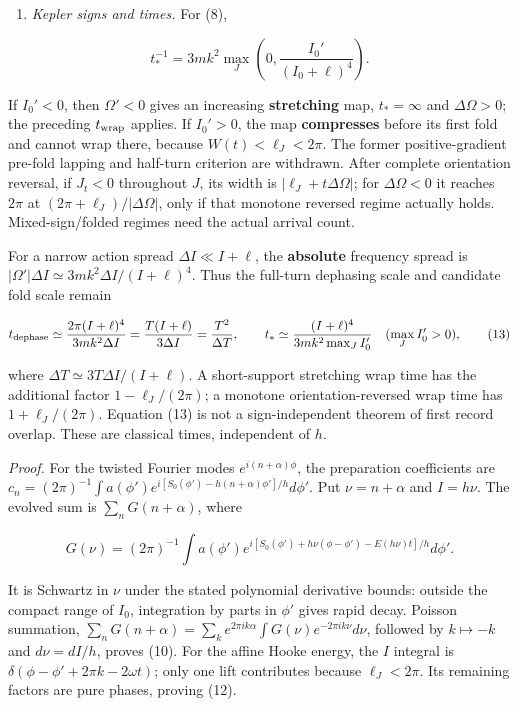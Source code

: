 \documentclass[11pt,a4paper]{article}
\newcommand{\tightlist}{\setlength{\itemsep}{0pt}\setlength{\parskip}{0pt}}
\begin{document}
\begin{enumerate}
\def\labelenumi{(\alph{enumi})}
\setcounter{enumi}{2}
\tightlist
\item
  \emph{Kepler signs and times.} For (8),
\end{enumerate}

\[t_*^{-1}=3mk^2\max_J\left(0,\frac{I_0'}{(I_0+\ell)^4}\right).\]

If \(I_0'<0\), then \(\Omega'<0\) gives an increasing
\textbf{stretching} map, \(t_*=\infty\) and \(\Delta\Omega>0\); the
preceding \(t_{\rm wrap}\) applies. If \(I_0'>0\), the map
\textbf{compresses} before its first fold and cannot wrap there, because
\(W(t)<\ell_J<2\pi\). The former positive-gradient pre-fold lapping and
half-turn criterion are withdrawn. After complete orientation reversal,
if \(J_t<0\) throughout \(J\), its width is \(|\ell_J+t\Delta\Omega|\);
for \(\Delta\Omega<0\) it reaches \(2\pi\) at
\((2\pi+\ell_J)/|\Delta\Omega|\), only if that monotone reversed regime
actually holds. Mixed-sign/folded regimes need the actual arrival count.

For a narrow action spread \(\Delta I\ll I+\ell\), the \textbf{absolute}
frequency spread is \(|\Omega'|\Delta I\simeq3mk^2\Delta I/(I+\ell)^4\).
Thus the full-turn dephasing scale and candidate fold scale remain

\[t_{\rm dephase}\simeq\frac{2\pi(I+\ell)^4}{3mk^2\Delta I}
 =\frac{T(I+\ell)}{3\Delta I}=\frac{T^2}{\Delta T},\qquad
 t_*\simeq\frac{(I+\ell)^4}{3mk^2\max_J I_0'}
 \quad(\max_J I_0'>0),\tag{13}\]

where \(\Delta T\simeq3T\Delta I/(I+\ell)\). A short-support stretching
wrap time has the additional factor \(1-\ell_J/(2\pi)\); a monotone
orientation-reversed wrap time has \(1+\ell_J/(2\pi)\). Equation (13) is
not a sign-independent theorem of first record overlap. These are
classical times, independent of \(h\).

\emph{Proof.} For the twisted Fourier modes \(e^{i(n+\alpha)\phi}\), the
preparation coefficients are
\(c_n=(2\pi)^{-1}\int a(\phi')e^{i[S_0(\phi')-h(n+\alpha)\phi']/h}d\phi'\).
Put \(\nu=n+\alpha\) and \(I=h\nu\). The evolved sum is
\(\sum_nG(n+\alpha)\), where

\[G(\nu)=(2\pi)^{-1}\int a(\phi')
 e^{i[S_0(\phi')+h\nu(\phi-\phi')-E(h\nu)t]/h}d\phi'.\]

It is Schwartz in \(\nu\) under the stated polynomial derivative bounds:
outside the compact range of \(I_0\), integration by parts in \(\phi'\)
gives rapid decay. Poisson summation,
\(\sum_nG(n+\alpha)=\sum_ke^{2\pi ik\alpha}\int G(\nu)e^{-2\pi ik\nu}d\nu\),
followed by \(k\mapsto-k\) and \(d\nu=dI/h\), proves (10). For the
affine Hooke energy, the \(I\) integral is
\(\delta(\phi-\phi'+2\pi k-2\omega t)\); only one lift contributes
because \(\ell_J<2\pi\). Its remaining factors are pure phases, proving
(12).
\end{document}
